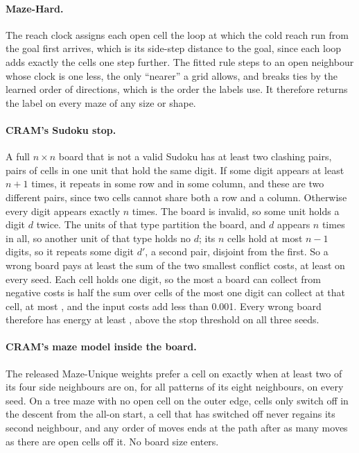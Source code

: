 \paragraph{Maze-Hard.} The reach clock assigns each open cell the loop at which the cold reach run from the goal first
arrives, which is its side-step distance to the goal, since each loop adds exactly the cells one step further. The fitted
rule steps to an open neighbour whose clock is one less, the only ``nearer'' a grid allows, and breaks ties by the learned
order of directions, which is the order the labels use. It therefore returns the label on every maze of any size or shape.

\paragraph{CRAM's Sudoku stop.} A full $n\times n$ board that is not a valid Sudoku has at least two clashing pairs,
pairs of cells in one unit that hold the same digit. If some digit appears at least $n+1$ times, it repeats in some row
and in some column, and these are two different pairs, since two cells cannot share both a row and a column. Otherwise
every digit appears exactly $n$ times. The board is invalid, so some unit holds a digit $d$ twice. The units of that type
partition the board, and $d$ appears $n$ times in all, so another unit of that type holds no $d$; its $n$ cells hold at
most $n-1$ digits, so it repeats some digit $d'$, a second pair, disjoint from the first. So a wrong board pays at least the sum of the two smallest conflict costs, at least  on every seed.
Each cell holds one digit, so the most a board can collect from negative costs is half the sum over cells of the most
one digit can collect at that cell, at most , and the input costs add less than 0.001. Every wrong
board therefore has energy at least , above the stop threshold on all three seeds.

\paragraph{CRAM's maze model inside the board.} The released Maze-Unique weights prefer a cell on exactly when at least
two of its four side neighbours are on, for all  patterns of its eight neighbours, on every seed.
On a tree maze with no open cell on the outer edge, cells only switch off in the descent from the all-on start, a cell
that has switched off never regains its second neighbour, and any order of moves ends at the path after as many moves as
there are open cells off it. No board size enters.

